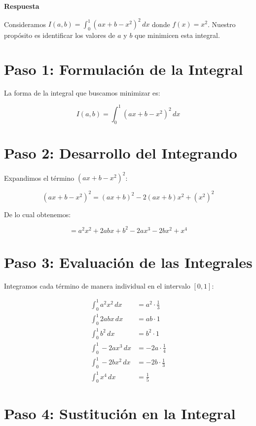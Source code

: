 \documentclass{report}
\begin{document}
\textbf{Respuesta}

Consideramos \( I(a,b) = \int_0^1 (ax + b - x^2)^2 \, dx \) donde \( f(x) = x^2 \). Nuestro propósito es identificar los valores de \( a \) y \( b \) que minimicen esta integral.

\section*{Paso 1: Formulación de la Integral}

La forma de la integral que buscamos minimizar es:

\begin{equation}
I(a,b) = \int_0^1 (ax + b - x^2)^2 \, dx
\end{equation}

\section*{Paso 2: Desarrollo del Integrando}

Expandimos el término \( (ax + b - x^2)^2 \):

\begin{equation}
(ax + b - x^2)^2 = (ax + b)^2 - 2(ax + b)x^2 + (x^2)^2
\end{equation}

De lo cual obtenemos:

\begin{equation}
= a^2 x^2 + 2abx + b^2 - 2ax^3 - 2bx^2 + x^4
\end{equation}

\section*{Paso 3: Evaluación de las Integrales}

Integramos cada término de manera individual en el intervalo \([0, 1]\):

\begin{align*}
\int_0^1 a^2 x^2 \, dx &= a^2 \cdot \frac{1}{3} \\
\int_0^1 2abx \, dx &= ab \cdot 1 \\
\int_0^1 b^2 \, dx &= b^2 \cdot 1 \\
\int_0^1 -2ax^3 \, dx &= -2a \cdot \frac{1}{4} \\
\int_0^1 -2bx^2 \, dx &= -2b \cdot \frac{1}{3} \\
\int_0^1 x^4 \, dx &= \frac{1}{5}
\end{align*}

\section*{Paso 4: Sustitución en la Integral}
\end{document}
